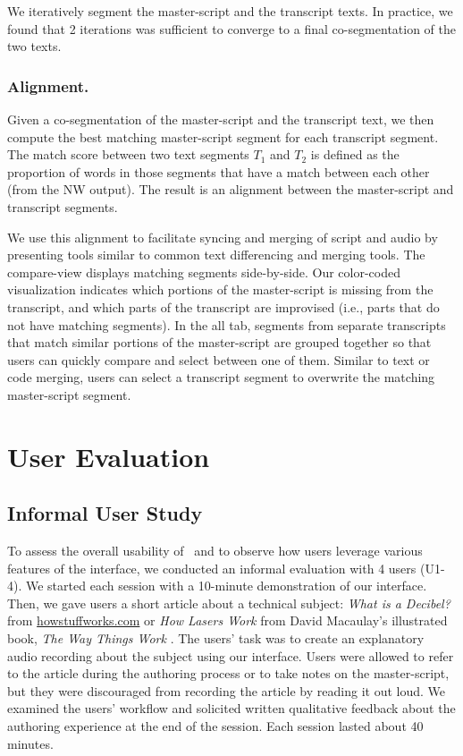 We iteratively segment the master-script and the transcript texts. In practice, we found that 2 iterations was sufficient to converge to a final co-segmentation of the two texts.

\subsubsection{Alignment.} 
Given a co-segmentation of the master-script and the transcript text, we then compute the best matching master-script segment for each transcript segment. The match score between two text segments $T_1$ and $T_2$ is defined as the proportion of words in those segments that have a match between each other (from the NW output).
The result is an alignment between the master-script and transcript segments. 

We use this alignment to facilitate syncing and merging of script and audio by presenting tools similar to  common text differencing and merging tools. The compare-view displays matching segments side-by-side. Our color-coded visualization indicates which portions of the master-script is missing from the transcript, and which parts of the transcript are improvised (i.e., parts that do not have matching segments). In the all tab, segments from separate transcripts that match similar portions of the master-script are grouped together so that users can quickly compare and select between one of them. Similar to text or code merging, users can select a transcript segment to overwrite the matching master-script segment.



\section{User Evaluation}
\label{sec:usereval}
\subsection{Informal User Study}
To assess the overall usability of \voicescript\ and to observe how users leverage various features of the interface, we conducted an informal evaluation with 4 users (U1-4). We started each session with a 10-minute demonstration of our interface. Then, we gave users a short article about a technical subject: \textit{What
is a Decibel?} from \url{howstuffworks.com} \cite{howstuffworks} or \textit{How Lasers Work} from
David Macaulay's illustrated book, \textit{The Way Things Work}
\cite{macaulay1999way}. The users' task was to create an explanatory audio recording about the subject using our interface. Users were allowed to refer to the article during the authoring process or to take notes on the master-script, but they were discouraged from recording the article by reading it out loud. We examined the users' workflow and solicited written qualitative feedback about the authoring experience at the end of the session. Each session lasted about 40 minutes.\\

